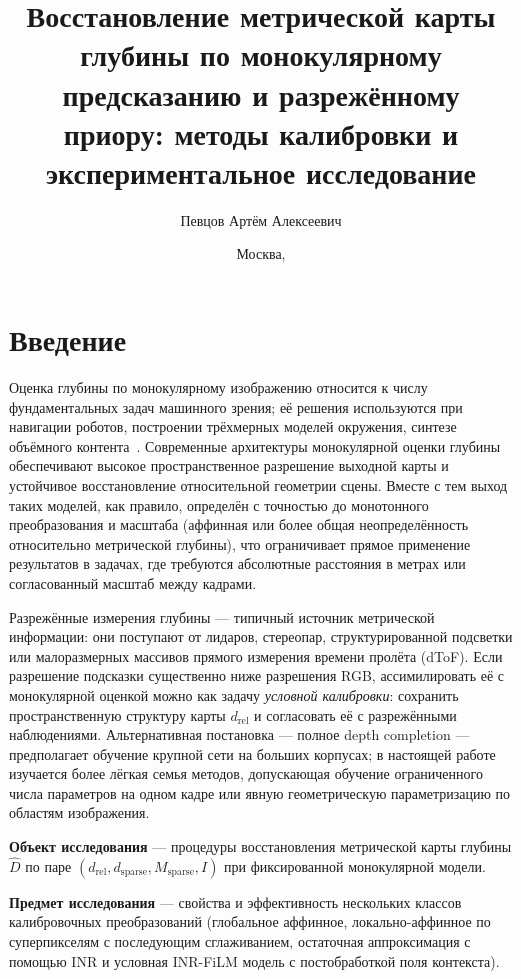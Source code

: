 \documentclass[12pt]{article}
\affiliation{Кафедра математической физики}
\author{Певцов Артём Алексеевич}
\title{Восстановление метрической карты глубины по монокулярному предсказанию и разрежённому приору: методы калибровки и экспериментальное исследование}
\date{Москва, \the\year{}}
\begin{document}
\maketitle
\maketoc

\section{Введение}

Оценка глубины по монокулярному изображению относится к числу фундаментальных задач машинного зрения; её решения используются при навигации роботов, построении трёхмерных моделей окружения, синтезе объёмного контента~\cite{eigen2014depth,ranftl2020robust}. Современные архитектуры монокулярной оценки глубины обеспечивают высокое пространственное разрешение выходной карты и устойчивое восстановление относительной геометрии сцены. Вместе с тем выход таких моделей, как правило, определён с точностью до монотонного преобразования и масштаба (аффинная или более общая неопределённость относительно метрической глубины), что ограничивает прямое применение результатов в задачах, где требуются абсолютные расстояния в метрах или согласованный масштаб между кадрами.

Разрежённые измерения глубины --- типичный источник метрической информации: они поступают от ли\-даров, стереопар, структурированной подсветки или малоразмерных массивов прямого измерения времени пролёта (dToF). Если разрешение подсказки существенно ниже разрешения RGB, ассимилировать её с монокулярной оценкой можно как задачу \emph{условной калибровки}: сохранить пространственную структуру карты $d_{\mathrm{rel}}$ и согласовать её с разрежёнными наблюдениями. Альтернативная постановка --- полное depth completion --- предполагает обучение крупной сети на больших корпусах; в настоящей работе изучается более лёгкая семья методов, допускающая обучение ограниченного числа параметров на одном кадре или явную геометрическую параметризацию по областям изображения.

\textbf{Объект исследования} --- процедуры восстановления метрической карты глубины $\hat D$ по паре $(d_{\mathrm{rel}}, d_{\mathrm{sparse}}, M_{\mathrm{sparse}}, I)$ при фиксированной монокулярной модели.

\textbf{Предмет исследования} --- свойства и эффективность нескольких классов калибровочных преобразований (глобальное аффинное, локально-аффинное по суперпикселям с последующим сглаживанием, остаточная аппроксимация с помощью INR и условная INR-FiLM модель с постобработкой поля контекста).
\end{document}
